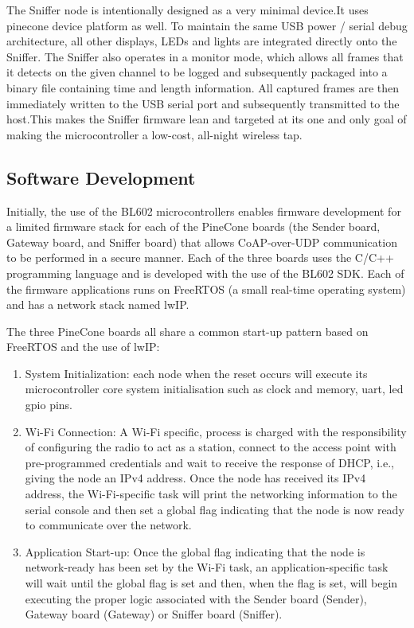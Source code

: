 \documentclass[USenglish,oneside,twocolumn]{article}
\begin{document}
    The Sniffer node is intentionally designed as a very minimal device.It uses pinecone device platform as well. To maintain the same USB power / serial debug architecture, all other displays, LEDs and lights are integrated directly onto the Sniffer. The Sniffer also operates in a monitor mode, which allows all frames that it detects on the given channel to be logged and subsequently packaged into a binary file containing time and length information. All captured frames are then immediately written to the USB serial port and subsequently transmitted to the host.This makes the Sniffer firmware lean and targeted at its one and only goal of making the microcontroller a low-cost, all-night wireless tap.

    \subsection{Software Development}
    Initially, the use of the BL602 microcontrollers enables firmware development for a limited firmware stack for each of the PineCone boards (the Sender board, Gateway board, and Sniffer board) that allows CoAP-over-UDP communication to be performed in a secure manner. Each of the three boards uses the C/C++ programming language and is developed with the use of the BL602 SDK. Each of the firmware applications runs on FreeRTOS (a small real-time operating system) and has a network stack named lwIP.

    The three PineCone boards all share a common start-up pattern based on FreeRTOS and the use of lwIP:

    \begin{enumerate}
    \item System Initialization:  each node when the reset occurs will execute its microcontroller core system initialisation such as clock and memory, uart, led gpio pins.
    \item Wi-Fi Connection: A Wi-Fi specific, process is charged with the responsibility of configuring the radio to act as a station, connect to the access point with pre-programmed credentials and wait to receive the response of DHCP, i.e., giving the node an IPv4 address. Once the node has received its IPv4 address, the Wi-Fi-specific task will print the networking information to the serial console and then set a global flag indicating that the node is now ready to communicate over the network.
    \item Application Start-up: Once the global flag indicating that the node is network-ready has been set by the Wi-Fi task, an application-specific task will wait until the global flag is set and then, when the flag is set, will begin executing the proper logic associated with the Sender board (Sender), Gateway board (Gateway) or Sniffer board (Sniffer).

    \end{enumerate}
\end{document}
